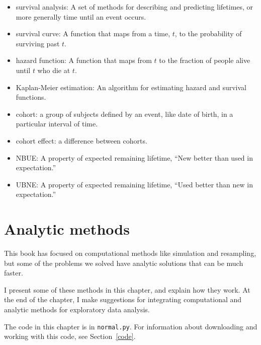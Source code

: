 \documentclass[12pt]{book}
\begin{document}
\begin{itemize}

\item survival analysis: A set of methods for describing and
  predicting lifetimes, or more generally time until an event occurs.

\item survival curve: A function that maps from a time, $t$, to the
  probability of surviving past $t$.

\item hazard function: A function that maps from $t$ to the fraction
of people alive until $t$ who die at $t$.

\item Kaplan-Meier estimation: An algorithm for estimating hazard and
survival functions.

\item cohort: a group of subjects defined by an event, like date of
birth, in a particular interval of time.

\item cohort effect: a difference between cohorts.

\item NBUE: A property of expected remaining lifetime, ``New
better than used in expectation.''

\item UBNE: A property of expected remaining lifetime, ``Used
better than new in expectation.''

\end{itemize}


\chapter{Analytic methods}
\label{analysis}

This book has focused on computational methods like simulation and
resampling, but some of the problems we solved have
analytic solutions that can be much faster.

I present some of these methods in this chapter, and explain
how they work.  At the end of the chapter, I make suggestions
for integrating computational and analytic methods for exploratory
data analysis.

The code in this chapter is in {\tt normal.py}.  For information
about downloading and working with this code, see Section~\ref{code}.
\end{document}
